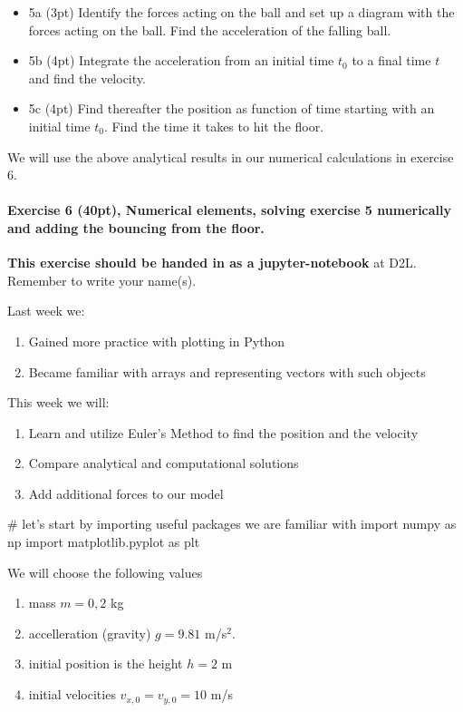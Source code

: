 \documentclass[%
oneside,                 %
final,                   %
10pt]{article}
\begin{document}
\begin{itemize}
\item 5a (3pt) Identify the forces acting on the ball and set up a diagram with the forces acting on the ball. Find the acceleration of the falling ball. 

\item 5b (4pt) Integrate the acceleration from an initial time $t_0$ to a final time $t$ and find the velocity.

\item 5c (4pt) Find thereafter the position as function of time starting with an initial time $t_0$. Find the time it takes to hit the floor.
\end{itemize}

\noindent
We will use the above analytical results in our numerical calculations in exercise 6.




\paragraph{Exercise 6 (40pt), Numerical elements, solving exercise 5 numerically and adding the bouncing from the floor.}
\textbf{This exercise should be handed in as a jupyter-notebook} at D2L. Remember to write your name(s). 

Last week we:
\begin{enumerate}
\item Gained more practice with plotting in Python

\item Became familiar with arrays and representing vectors with such objects
\end{enumerate}

\noindent
This week we will:
\begin{enumerate}
\item Learn and utilize Euler's Method to find the position and the velocity

\item Compare analytical and computational solutions 

\item Add additional forces to our model
\end{enumerate}

\noindent
\bpycod
# let's start by importing useful packages we are familiar with
import numpy as np
import matplotlib.pyplot as plt
\epycod

We will choose the following values
\begin{enumerate}
\item mass $m=0,2$ kg

\item accelleration (gravity) $g=9.81$ m/s$^{2}$.

\item initial position is the height $h=2$ m

\item initial velocities $v_{x,0}=v_{y,0}=10$ m/s
\end{enumerate}
\end{document}
